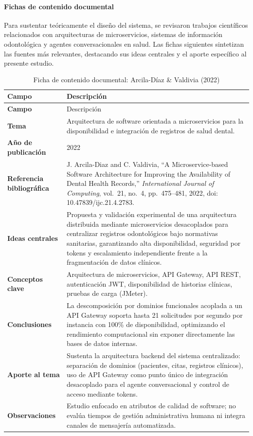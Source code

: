 \paragraph{Fichas de contenido documental}

Para sustentar teóricamente el diseño del sistema, se revisaron trabajos científicos relacionados con arquitecturas de microservicios, sistemas de información odontológica y agentes conversacionales en salud. Las fichas siguientes sintetizan las fuentes más relevantes, destacando sus ideas centrales y el aporte específico al presente estudio.

\begingroup
\fontsize{10}{12}\selectfont
\renewcommand{\arraystretch}{1.2}
\setlength{\LTpre}{0pt}\setlength{\LTpost}{10pt}

\begin{longtable}{|>{\bfseries}p{4cm}|p{\dimexpr\linewidth-4cm-4\tabcolsep-4\arrayrulewidth\relax}|}
\caption{Ficha de contenido documental: Arcila-Díaz \& Valdivia (2022)}
\label{tab:ficha_arcila_2022} \\
\hline
Campo & Descripción \\ \hline
\endfirsthead
\hline
Campo & Descripción \\ \hline
\endhead
\hline
\endfoot
Tema & Arquitectura de software orientada a microservicios para la disponibilidad e integración de registros de salud dental. \\ \hline
Año de publicación & 2022 \\ \hline
Referencia bibliográfica & J. Arcila-Diaz and C. Valdivia, ``A Microservice-based Software Architecture for Improving the Availability of Dental Health Records,'' \textit{International Journal of Computing}, vol.~21, no.~4, pp.~475--481, 2022, doi: 10.47839/ijc.21.4.2783. \\ \hline
Ideas centrales & Propuesta y validación experimental de una arquitectura distribuida mediante microservicios desacoplados para centralizar registros odontológicos bajo normativas sanitarias, garantizando alta disponibilidad, seguridad por tokens y escalamiento independiente frente a la fragmentación de datos clínicos. \\ \hline
Conceptos clave & Arquitectura de microservicios, API Gateway, API REST, autenticación JWT, disponibilidad de historias clínicas, pruebas de carga (JMeter). \\ \hline
Conclusiones & La descomposición por dominios funcionales acoplada a un API Gateway soporta hasta 21 solicitudes por segundo por instancia con 100\% de disponibilidad, optimizando el rendimiento computacional sin exponer directamente las bases de datos internas. \\ \hline
Aporte al tema & Sustenta la arquitectura backend del sistema centralizado: separación de dominios (pacientes, citas, registros clínicos), uso de API Gateway como punto único de integración desacoplado para el agente conversacional y control de acceso mediante tokens. \\ \hline
Observaciones & Estudio enfocado en atributos de calidad de software; no evalúa tiempos de gestión administrativa humana ni integra canales de mensajería automatizada. \\ \hline
\end{longtable}


